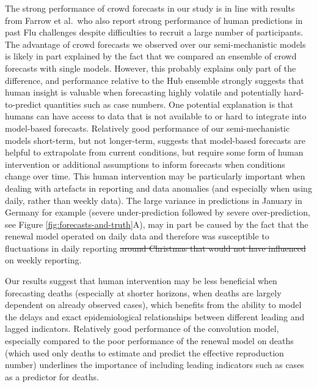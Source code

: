 \documentclass[10pt,letterpaper]{article} %
\providecommand{\DIFaddtex}[1]{{\protect\color{blue}\uwave{#1}}} %
\providecommand{\DIFdeltex}[1]{{\protect\color{red}\sout{#1}}}                      %
\providecommand{\DIFaddbegin}{} %
\providecommand{\DIFaddend}{} %
\providecommand{\DIFdelbegin}{} %
\providecommand{\DIFdelend}{} %
\providecommand{\DIFadd}[1]{\texorpdfstring{\DIFaddtex{#1}}{#1}} %
\providecommand{\DIFdel}[1]{\texorpdfstring{\DIFdeltex{#1}}{}} %
\newcommand{\DIFscaledelfig}{0.5}
\newlength{\DIFdelgraphicswidth} %
\newlength{\DIFdelgraphicsheight} %
\newcommand{\DIFaddincludegraphics}[2][]{{\color{blue}\fbox{\DIFOincludegraphics[#1]{#2}}}} %
\newcommand{\DIFdelincludegraphics}[2][]{%
\sbox{\DIFdelgraphicsbox}{\DIFOincludegraphics[#1]{#2}}%
\settoboxwidth{\DIFdelgraphicswidth}{\DIFdelgraphicsbox} %
\settoboxtotalheight{\DIFdelgraphicsheight}{\DIFdelgraphicsbox} %
\scalebox{\DIFscaledelfig}{%
\parbox[b]{\DIFdelgraphicswidth}{\usebox{\DIFdelgraphicsbox}\\[-\baselineskip] \rule{\DIFdelgraphicswidth}{0em}}\llap{\resizebox{\DIFdelgraphicswidth}{\DIFdelgraphicsheight}{%
\setlength{\unitlength}{\DIFdelgraphicswidth}%
\begin{picture}(1,1)%
\thicklines\linethickness{2pt} %
{\color[rgb]{1,0,0}\put(0,0){\framebox(1,1){}}}%
{\color[rgb]{1,0,0}\put(0,0){\line( 1,1){1}}}%
{\color[rgb]{1,0,0}\put(0,1){\line(1,-1){1}}}%
\end{picture}%
}\hspace*{3pt}}} %
} %
\DeclareRobustCommand{\DIFaddbegin}{\DIFOaddbegin \let\includegraphics\DIFaddincludegraphics} %
\DeclareRobustCommand{\DIFaddend}{\DIFOaddend \let\includegraphics\DIFOincludegraphics} %
\DeclareRobustCommand{\DIFdelbegin}{\DIFOdelbegin \let\includegraphics\DIFdelincludegraphics} %
\DeclareRobustCommand{\DIFdelend}{\DIFOaddend \let\includegraphics\DIFOincludegraphics} %
\begin{document}
The strong performance of crowd forecasts in our study is in line with
results from Farrow et al.~who also report strong performance of human
predictions in past Flu challenges despite difficulties to recruit a
large number of participants. The advantage of crowd forecasts we
observed over our semi-mechanistic models is likely in part explained by
the fact that we compared an ensemble of crowd forecasts with single
models. However, this probably explains only part of the difference, and
performance relative to the Hub ensemble strongly suggests that human
insight is valuable when forecasting highly volatile and potentially
hard-to-predict quantities such as case numbers. One potential
explanation is that humans can have access to data that is not available
to or hard to integrate into model-based forecasts. Relatively good
performance of our semi-mechanistic models short-term, but not
longer-term, suggests that model-based forecasts are helpful to
extrapolate from current conditions, but require some form of human
intervention or additional assumptions to inform forecasts when
conditions change over time. This human intervention may be particularly
important when dealing with artefacts in reporting and data anomalies
(and especially when using daily, rather than weekly data). The large
variance in predictions in January in Germany for example (severe
under-prediction followed by severe over-prediction, see Figure
\ref{fig:forecasts-and-truth}A), may in part be caused by the fact that
the renewal model operated on daily data and therefore was susceptible
to fluctuations in daily reporting \DIFdelbegin \DIFdel{around Christmas that would not have influenced }\DIFdelend \DIFaddbegin \DIFadd{which have less of an influence }\DIFaddend on
weekly reporting.

Our results suggest that human intervention may be less beneficial when
forecasting deaths (especially at shorter horizons, when deaths are
largely dependent on already observed cases), which benefits from the
ability to model the delays and exact epidemiological relationships
between different leading and lagged indicators. Relatively good
performance of the convolution model, especially compared to the poor
performance of the renewal model on deaths (which used only deaths to
estimate and predict the effective reproduction number) underlines the
importance of including leading indicators such as cases as a predictor
for deaths.
\end{document}
